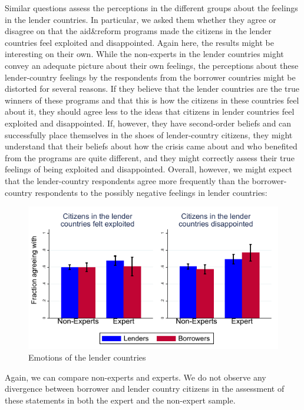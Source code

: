 Similar questions assess the perceptions in the different groups about the
feelings in the lender countries. In particular, we asked them whether they
agree or disagree on that the aid\&reform programs made the citizens in the
lender countries feel exploited and disappointed. Again here, the results
might be interesting on their own. While the non-experts in the lender
countries might convey an adequate picture about their own feelings, the
perceptions about these lender-country feelings by the respondents from the
borrower countries might be distorted for several reasons. If they believe
that the lender countries are the true winners of these programs and that
this is how the citizens in these countries feel about it, they should agree
less to the ideas that citizens in lender countries feel exploited and
disappointed. If, however, they have second-order beliefs and can
successfully place themselves in the shoes of lender-country citizens, they
might understand that their beliefs about how the crisis came about and who
benefited from the programs are quite different, and they might correctly
assess their true feelings of being exploited and disappointed. Overall,
however, we might expect that the lender-country respondents agree more
frequently than the borrower-country respondents to the possibly negative
feelings in lender countries:

\begin{figure}[h!]
    \centering
       \caption{Emotions of the lender countries}
    \includegraphics[scale=1.2]{graph5_2.pdf}
 
    \label{fig:my_label}
\end{figure}

Again, we can compare non-experts and experts. We do not observe any divergence 
between borrower and lender country citizens in the assessment of these statements in
both the expert and the non-expert sample. 

